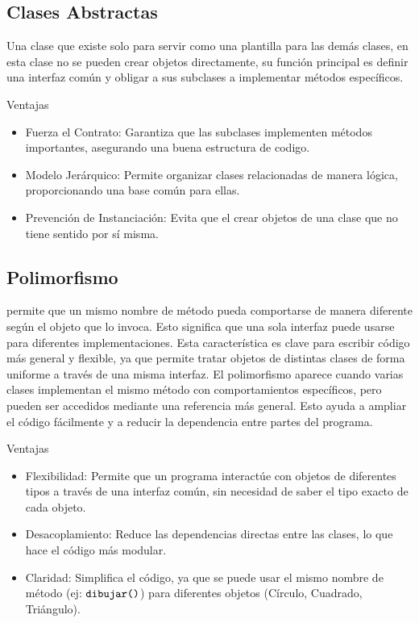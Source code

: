\documentclass{article}
\begin{document}
\subsection{Clases Abstractas}
Una clase que existe solo para servir como una plantilla para las demás clases, en esta clase
no se pueden crear objetos directamente, su función principal es definir una interfaz común y 
obligar a sus subclases a implementar métodos específicos.

\par\vspace{1.2em} 

\large{{Ventajas}}
\begin{itemize}
    \item {Fuerza el Contrato:} Garantiza que las subclases implementen métodos importantes,
    asegurando una buena estructura de codigo.
    \item {Modelo Jerárquico:} Permite organizar clases relacionadas de manera lógica, 
    proporcionando una base común para ellas.
    \item {Prevención de Instanciación:} Evita que el crear objetos de una clase que no tiene 
    sentido por sí misma.
\end{itemize}


\subsection{Polimorfismo}
permite que un mismo nombre de método pueda comportarse de manera diferente según el objeto 
que lo invoca. Esto significa que una sola interfaz puede usarse para diferentes 
implementaciones. Esta característica es clave para escribir código más general y flexible, 
ya que permite tratar objetos de distintas clases de forma uniforme a través de una misma 
interfaz. El polimorfismo aparece cuando varias clases implementan el mismo método con 
comportamientos específicos, pero pueden ser accedidos mediante una referencia más general. 
Esto ayuda a ampliar el código fácilmente y a reducir la dependencia entre partes del 
programa.

\par\vspace{1.2em} 

\large{{Ventajas}}
\begin{itemize}
    \item {Flexibilidad:} Permite que un programa interactúe con objetos de diferentes tipos
    a través de una interfaz común, sin necesidad de saber el tipo exacto de cada objeto.
    \item {Desacoplamiento:} Reduce las dependencias directas entre las clases, lo que hace 
    el código más modular.
    \item {Claridad:} Simplifica el código, ya que se puede usar el mismo nombre de método 
    (ej: $\verb|dibujar()|$) para diferentes objetos (Círculo, Cuadrado, Triángulo).
\end{itemize}
\end{document}
